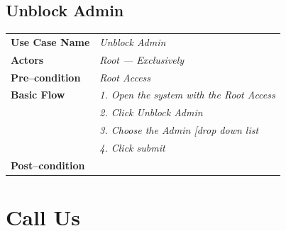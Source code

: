 \documentclass{article}
\begin{document}
\subsection{Unblock Admin}
    \begin{tabular}{ l | l }
    \toprule
      \rowcolor{LightCyan}
      \textbf{Use Case Name}    & \textit{Unblock Admin}\\
      \textbf{Actors}           & \textit{Root --- Exclusively}\\
      \rowcolor{LightCyan}
      \textbf{Pre--condition}   & \textit{Root Access}\\
      \textbf{Basic Flow}       & \textit{1. Open the system with the Root Access}\\
                                & \textit{2. Click Unblock Admin}\\
                                & \textit{3. Choose the Admin [drop down list}\\
                                & \textit{4. Click submit}\\
      \rowcolor{LightCyan}
      \textbf{Post--condition}  & \textit{}\\
    \toprule
    \end{tabular}





\section{Call Us}
\end{document}
